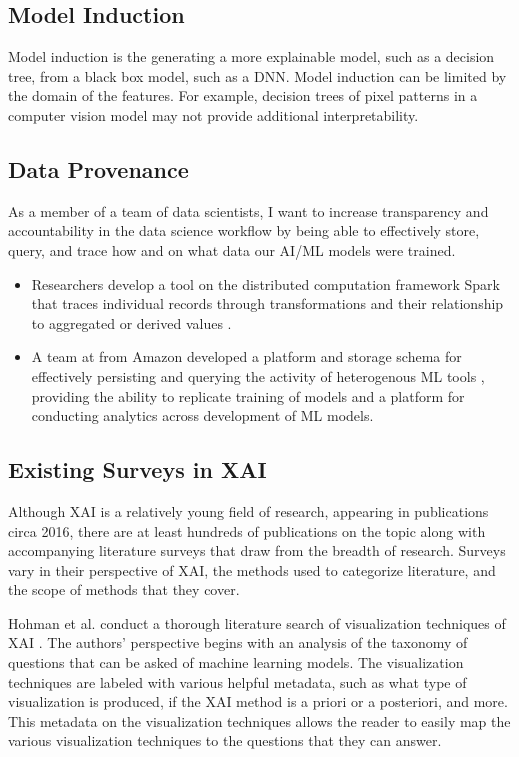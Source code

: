 \subsection{Model Induction}

Model induction is the generating a more explainable model, such as a decision tree, from a black box model, such as a DNN.  Model induction can be limited by the domain of the features.  For example, decision trees of pixel patterns in a computer vision model may not provide additional interpretability.

\subsection{Data Provenance}

As a member of a team of data scientists, I want to increase transparency and accountability in the data science workflow by being able to effectively store, query, and trace how and on what data our AI/ML models were trained.

\begin{itemize}
    \item Researchers develop a tool on the distributed computation framework Spark that traces individual records through transformations and their relationship to aggregated or derived values  \cite{Interlandi2017}.
    \item A team at from Amazon developed a platform and storage schema for effectively persisting and querying the activity of heterogenous ML tools \cite{Schelter2017}, providing the ability to replicate training of models and a platform for conducting analytics across development of ML models.
\end{itemize}

\subsection{Existing Surveys in XAI}

Although XAI is a relatively young field of research, appearing in publications circa 2016, there are at least hundreds of publications on the topic along with accompanying literature surveys that draw from the breadth of research.  Surveys vary in their perspective of XAI, the methods used to categorize literature, and the scope of methods that they cover.

Hohman et al. conduct a thorough literature search of visualization techniques of XAI \cite{Hohman2018}.  The authors' perspective begins with an analysis of the taxonomy of questions that can be asked of machine learning models.  The visualization techniques are labeled with various helpful metadata, such as what type of visualization is produced, if the XAI method is a priori or a posteriori, and more.  This metadata on the visualization techniques allows the reader to easily map the various visualization techniques to the questions that they can answer.

